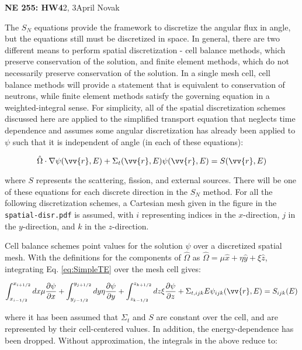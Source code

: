 \documentclass[10pt]{article}
\newcommand*\circled[1]{\tikz[baseline=(char.base)]{
            \node[shape=circle,draw,inner sep=2pt] (char) {#1};}}
\begin{document}
\textbf{NE 255: HW4}2, 3\hfill April Novak\newline

\circled{1} The \(S_N\) equations provide the framework to discretize the angular flux in angle, but the equations still must be discretized in space. In general, there are two different means to perform spatial discretization - cell balance methods, which preserve conservation of the solution, and finite element methods, which do not necessarily preserve conservation of the solution. In a single mesh cell, cell balance methods will provide a statement that is equivalent to conservation of neutrons, while finite element methods satisfy the governing equation in a weighted-integral sense. For simplicity, all of the spatial discretization schemes discussed here are applied to the simplified transport equation that neglects time dependence and assumes some angular discretization has already been applied to \(\psi\) such that it is independent of angle (in each of these equations):

\begin{equation}
\label{eq:SimpleTE}
\hat{\Omega}\cdot\nabla\psi(\vv{r},E)+\Sigma_t({\vv{r},E})\psi(\vv{r},E)=S(\vv{r},E)
\end{equation}

where \(S\) represents the scattering, fission, and external sources. There will be one of these equations for each discrete direction in the \(S_N\) method. For all the following discretization schemes, a Cartesian mesh given in the figure in the \texttt{spatial-disr.pdf} is assumed, with \(i\) representing indices in the \(x\)-direction, \(j\) in the \(y\)-direction, and \(k\) in the \(z\)-direction.

Cell balance schemes point values for the solution \(\psi\) over a discretized spatial mesh. With the definitions for the components of \(\hat{\Omega}\) as \(\hat{\Omega}=\mu\hat{x}+\eta\hat{y}+\xi\hat{z}\), integrating Eq. \eqref{eq:SimpleTE} over the mesh cell gives:

\begin{equation}
\int_{x_{i-1/2}}^{x_{i+1/2}}dx\mu \frac{\partial \psi}{\partial x}+\int_{y_{j-1/2}}^{y_{j+1/2}}dy\eta \frac{\partial \psi}{\partial y}+\int_{z_{k-1/2}}^{z_{k+1/2}}dz\xi \frac{\partial \psi}{\partial z}+\Sigma_{t,ijk}{E}\psi_{ijk}(\vv{r},E)=S_{ijk}(E)
\end{equation}

where it has been assumed that \(\Sigma_t\) and \(S\) are constant over the cell, and are represented by their cell-centered values. In addition, the energy-dependence has been dropped. Without approximation, the integrals in the above reduce to:
\end{document}
